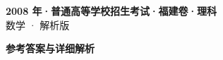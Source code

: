 \documentclass[zihao=-4, a4paper]{ctexart}
\begin{document}
\begin{center}
  {\Large\bfseries 2008 年·普通高等学校招生考试·福建卷·理科}\\[4pt]
  {\large 数学 · 解析版}
\end{center}
\medskip
{}

\clearpage
{}
\begin{center}{\Large\bfseries 参考答案与详细解析}\end{center}
\medskip

\end{document}
